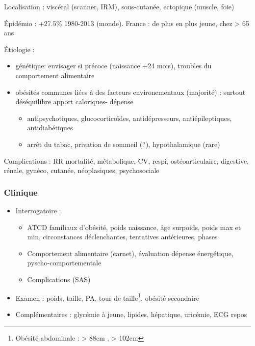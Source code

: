 \documentclass[11pt]{article}
\begin{document}
Localisation : viscéral (scanner, IRM), sous-cutanée, ectopique (muscle, foie)

Épidémio : +27.5\% 1980-2013 (monde). France : de plus en plus jeune, \inc chez >
65 ans

Étiologie :
\begin{itemize}
\item génétique: envisager si précoce (naissance +24 mois), troubles du
comportement alimentaire
\item obésités communes liées à des facteurs environementaux (majorité) : surtout
déséquilibre apport caloriques- dépense
\begin{itemize}
\item antipsychotiques, glucocorticoïdes, antidépresseurs,
antiépileptiques, antidiabétiques
\item arrêt du tabac, privation de sommeil (?), hypothalamique (rare)
\end{itemize}
\end{itemize}

Complications : \inc RR mortalité, métabolique, CV, respi, ostéoarticulaire,
digestive, rénale, gynéco, cutanée, néoplasiques, psychosociale

\subsubsection{Clinique}
\label{sec:org571cd56}
\begin{itemize}
\item Interrogatoire : 
\begin{itemize}
\item ATCD familiaux d'obésité, poids naissance, âge surpoids,
poids max et min, circonstances déclenchantes, tentatives antérieures, phases
\item Comportement alimentaire (carnet), évaluation dépense énergétique, pyscho-comportementale
\item Complications (SAS)
\end{itemize}
\item Examen : poids, taille, PA, tour de taille\footnote{Obésité abdominale : > 88cm \female, > 102cm \male}, obésité secondaire
\item Complémentaires : glycémie à jeune, lipides, hépatique, uricémie, ECG repos
\end{itemize}
\end{document}
